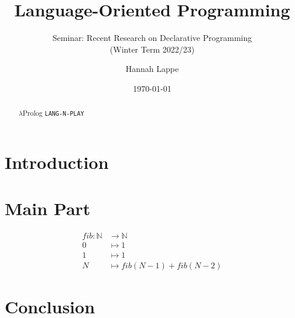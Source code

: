 \documentclass[a4paper, 12pt]{scrartcl}
\title{Language-Oriented Programming}
\subtitle{Seminar: Recent Research on Declarative Programming\\
  (Winter Term 2022/23)}
\author{Hannah Lappe}
\date{\today}
\begin{document}
\maketitle

\begin{abstract}
  \blindtext
  $\lambda$Prolog
  \texttt{LANG-N-PLAY}
\end{abstract}

\section{Introduction}
\blindtext

\section{Main Part}
\blindtext \cite{cimini_effectiveness_2020}

\begin{align*}
  fib : \mathbb{N} & \longrightarrow \mathbb{N}      \\
  0                & \longmapsto 1                   \\
  1                & \longmapsto 1                   \\
  N                & \longmapsto fib(N-1) + fib(N-2)
\end{align*}


\section{Conclusion}
\cite{*}




\end{document}
